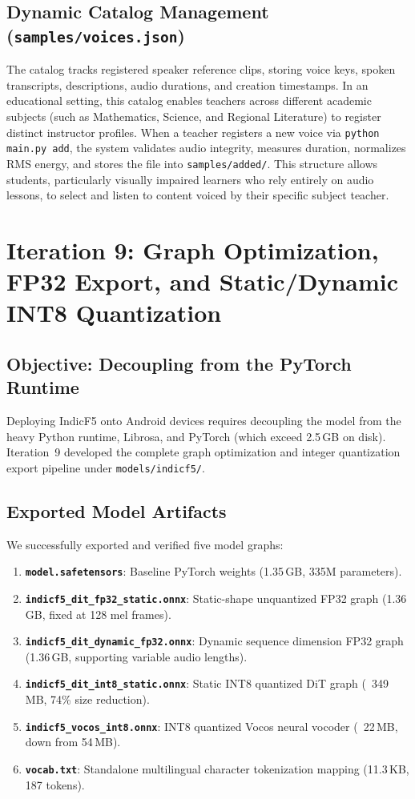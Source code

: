 \subsection{Dynamic Catalog Management (\texttt{samples/voices.json})}
The catalog tracks registered speaker reference clips, storing voice keys, spoken transcripts, descriptions, audio durations, and creation timestamps. In an educational setting, this catalog enables teachers across different academic subjects (such as Mathematics, Science, and Regional Literature) to register distinct instructor profiles. When a teacher registers a new voice via \texttt{python main.py add}, the system validates audio integrity, measures duration, normalizes RMS energy, and stores the file into \texttt{samples/added/}. This structure allows students, particularly visually impaired learners who rely entirely on audio lessons, to select and listen to content voiced by their specific subject teacher.

\section[Iteration 9: Graph Optimization and INT8 Quantization]{Iteration 9: Graph Optimization, FP32 Export, and Static/Dynamic INT8 Quantization}
\subsection{Objective: Decoupling from the PyTorch Runtime}
Deploying IndicF5 onto Android devices requires decoupling the model from the heavy Python runtime, Librosa, and PyTorch (which exceed 2.5\,GB on disk). Iteration~9 developed the complete graph optimization and integer quantization export pipeline under \texttt{models/indicf5/}.

\subsection{Exported Model Artifacts}
We successfully exported and verified five model graphs:
\begin{enumerate}
    \item \textbf{\texttt{model.safetensors}}: Baseline PyTorch weights (1.35\,GB, 335M parameters).
    \item \textbf{\texttt{indicf5\_dit\_fp32\_static.onnx}}: Static-shape unquantized FP32 graph (1.36\,GB, fixed at 128 mel frames).
    \item \textbf{\texttt{indicf5\_dit\_dynamic\_fp32.onnx}}: Dynamic sequence dimension FP32 graph (1.36\,GB, supporting variable audio lengths).
    \item \textbf{\texttt{indicf5\_dit\_int8\_static.onnx}}: Static INT8 quantized DiT graph (~349\,MB, 74\% size reduction).
    \item \textbf{\texttt{indicf5\_vocos\_int8.onnx}}: INT8 quantized Vocos neural vocoder (~22\,MB, down from 54\,MB).
    \item \textbf{\texttt{vocab.txt}}: Standalone multilingual character tokenization mapping (11.3\,KB, 187 tokens).
\end{enumerate}

